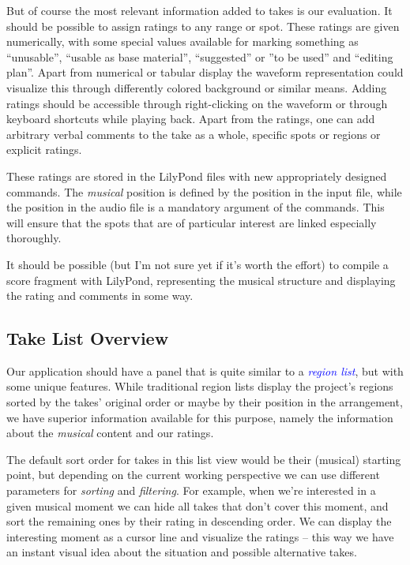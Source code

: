 \documentclass[11pt,a4paper]{article}
\newcommand*{\term}[1]{\textcolor{blue}{\emph{#1}}}
\begin{document}
But of course the most relevant information added to takes is our evaluation.
It should be possible to assign ratings to any range or spot.
These ratings are given numerically, with some special values available for
marking something as “unusable”, “usable as base material”, “suggested” or ”to
be used” and “editing plan”.
Apart from numerical or tabular display the waveform representation could
visualize this through differently colored background or similar means.
Adding ratings should be accessible through right-clicking on the waveform or
through keyboard shortcuts while playing back.
Apart from the ratings, one can add arbitrary verbal comments to the take as a
whole, specific spots or regions or explicit ratings.

These ratings are stored in the LilyPond files with new appropriately designed
commands.
The \emph{musical} position is defined by the position in the input file, while
the position in the audio file is a mandatory argument of the commands.
This will ensure that the spots that are of particular interest are linked
especially thoroughly.

It should be possible (but I'm not sure yet if it's worth the effort) to compile
a score fragment with LilyPond, representing the musical structure and
displaying the rating and comments in some way.


\subsection{Take List Overview}
Our application should have a panel that is quite similar to a \term{region
list}, but with some unique features.
While traditional region lists display the project's regions sorted by the
takes' original order or maybe by their position in the arrangement, we have
superior information available for this purpose, namely the information about the
\emph{musical} content and our ratings.

The default sort order for takes in this list view would be their (musical)
starting point, but depending on the current working perspective we can use
different parameters for \emph{sorting} and \emph{filtering}.
For example, when we're interested in a given musical moment we can hide all
takes that don't cover this moment, and sort the remaining ones by their rating
in descending order.
We can display the interesting moment as a cursor line and visualize the ratings
-- this way we have an instant visual idea about the situation and possible
alternative takes.
\end{document}

